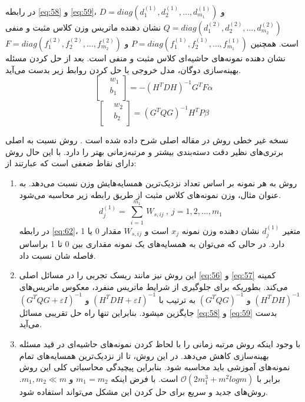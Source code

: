 در رابطه \ref{eq:58} و \ref{eq:59}،  $D=diag(d^{(1)}_{1},d^{(1)}_{2},\dots,d^{(1)}_{m_{1}})$ و  $Q=diag(d^{(2)}_{1},d^{(2)}_{2},\dots,d^{(2)}_{m_{2}})$ نشان دهنده ماتریس وزن کلاس مثبت و منفی است.  همچنین  $P=diag(f^{(1)}_{1},f^{(1)}_{2},\dots,f^{(1)}_{m_{1}})$  و $F=diag(f^{(2)}_{1},f^{(2)}_{2},\dots,f^{(2)}_{m_{2}})$ نشان دهنده نمونه‌های حاشیه‌ای کلاس مثبت و منفی است. بعد از حل کردن مسئله بهینه‌سازی دوگان، مدل خروجی با حل کردن روابط زیر بدست می‌آید.
\begin{equation}
\left[ \begin{aligned}
& {{w}_{1}} \\
& {{b}_{1}} \\
\end{aligned}\right]= -{{({{H}^{T}}DH)}^{-1}}{{G}^{T}}F\alpha
\label{eq:60}
\end{equation}
\begin{equation}
\left[ \begin{aligned}
& {{w}_{2}} \\
& {{b}_{2}} \\
\end{aligned}\right]= {{({{G}^{T}}QG)}^{-1}}{{H}^{T}}P\beta
\label{eq:61}
\end{equation}

نسخه غیر خطی روش  در مقاله اصلی شرح داده شده است \cite{ye2012}. روش  نسبت به  اصلی برتری‌های نظیر دقت دسته‌بندی بیشتر و مرتبه‌زمانی بهتر را دارد. با این حال روش  دارای نقاط ضعفی است که عبارتند از:
\begin{enumerate}
	\item روش  به هر نمونه بر اساس تعداد نزدیک‌ترین همسایه‌هایش وزن نسبت می‌دهد. به عنوان مثال، وزن نمونه‌های کلاس مثبت از طریق رابطه زیر محاسبه می‌شود.
	\begin{equation}
	{{d}_{j}^{(1)}}=~\underset{i=1}{\overset{{{m}_{1}}}{\mathop \sum }}\,{{W}_{s,ij}}~,~j=1,2,\ldots ,{{m}_{1}}
	\label{eq:62}
	\end{equation}
	در رابطه \ref{eq:62}، متغیر $d_{j}^{(1)}$ نشان دهنده وزن نمونه $x_{j}$ است و  $W_{s,ij}$ مقدار 0 یا 1 دارد. در حالی که می‌توان به همسایه‌های یک نمونه مقداری بین 0 تا 1 براساس فاصله شان نسبت داد. 
	
	\item این روش نیز مانند  ریسک تجربی را در مسائل اصلی \ref{eq:56} و \ref{eq:57} کمینه می‌کند. بطوریکه برای جلوگیری از شرایط ماتریس منفرد، معکوس ماتریس‌های   $({H}^{T}DH)^{-1}$ و  $({G}^{T}QG)^{-1}$  به ترتیب با   $({H}^{T}DH + \varepsilon I)^{-1}$ و $({G}^{T}QG + \varepsilon I)^{-1}$  جایگزین میشود. بنابراین تنها راه حل تقریبی مسائل \ref{eq:58} و \ref{eq:59} بدست می‌آید.
	\item با وجود اینکه روش   مرتبه زمانی را با لحاظ کردن نمونه‌های حاشیه‌ای در قید مسئله بهینه‌سازی کاهش می‌دهد. در این روش،  تا از نزدیک‌ترین همسایه‌های تمام نمونه‌های آموزشی باید محاسبه شود. بنابراین پیچیدگی محاسباتی کلی این روش برابر با  $\mathcal{O}(2m_{1}^{3}+m^{2}logm)$ است. با فرض اینکه  $m_{1}=m_{2}$  و  $m_{1},m_{2} \ll m$. روش‌های جدید و سریع  برای حل کردن این مشکل می‌تواند استفاده شود.
\end{enumerate}
